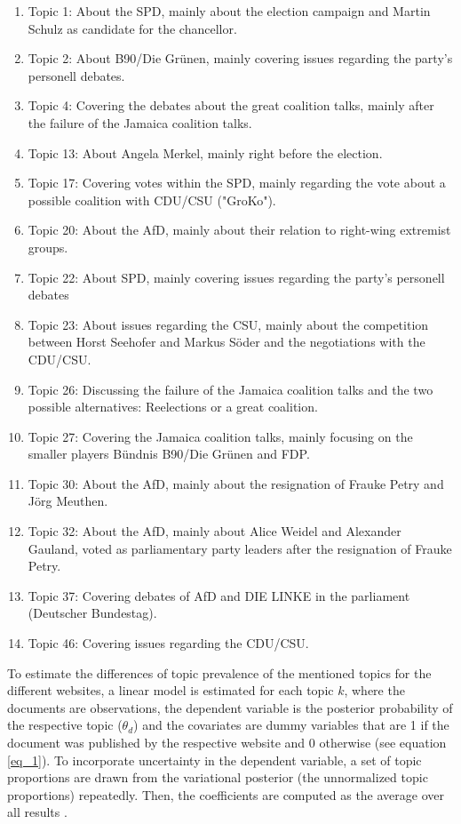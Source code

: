 \documentclass[12pt,a4paper,notitlepage]{article}
\begin{document}
\begin{enumerate}
	\item Topic 1: About the SPD, mainly about the election campaign and Martin Schulz as candidate for the chancellor.	
	\item Topic 2: About B90/Die Grünen, mainly covering issues regarding the party's personell debates.
	\item Topic 4: Covering the debates about the great coalition talks, mainly after the failure of the Jamaica coalition talks.
	\item Topic 13: About Angela Merkel, mainly right before the election. 
	\item Topic 17: Covering votes within the SPD, mainly regarding the vote about a possible coalition with CDU/CSU ("GroKo").	
	\item Topic 20: About the AfD, mainly about their relation to right-wing extremist groups.
	\item Topic 22: About SPD, mainly covering issues regarding the party's personell debates
	\item Topic 23: About issues regarding the CSU, mainly about the competition between Horst Seehofer and Markus Söder and the negotiations with the CDU/CSU.
	\item Topic 26: Discussing the failure of the Jamaica coalition talks and the two possible alternatives: Reelections or a great coalition.
	\item Topic 27: Covering the Jamaica coalition talks, mainly focusing on the smaller players Bündnis B90/Die Grünen and FDP.	
	\item Topic 30: About the AfD, mainly about the resignation of Frauke Petry and Jörg Meuthen.
	\item Topic 32: About the AfD, mainly about Alice Weidel and Alexander Gauland, voted as parliamentary party leaders after the resignation of Frauke Petry.
	\item Topic 37: Covering debates of AfD and DIE LINKE in the parliament (Deutscher Bundestag).
	\item Topic 46: Covering issues regarding the CDU/CSU.
\end{enumerate}   

To estimate the differences of topic prevalence of the mentioned topics for the different websites, a linear model is estimated for each topic $k$, where the documents are observations, the dependent variable is the posterior probability of the respective topic ($\theta_{d}$) and the covariates are dummy variables that are 1 if the document was published by the respective website and 0 otherwise (see equation \ref{eq_1}). To incorporate uncertainty in the dependent variable, a set of topic proportions are drawn from the variational posterior (the unnormalized topic proportions) repeatedly. Then, the coefficients are computed as the average over all results \citep{roberts_model_2016}.
\end{document}
